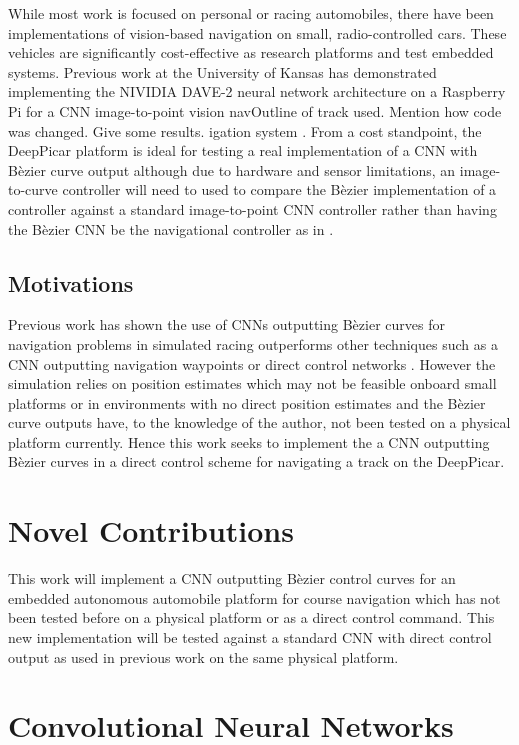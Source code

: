 \documentclass[conference]{IEEEtran}
\begin{document}
While most work is focused on personal or racing automobiles, there have been implementations of vision-based navigation on small, radio-controlled cars. These vehicles are significantly cost-effective as research platforms and test embedded systems. Previous work at the University of Kansas has demonstrated implementing the NIVIDIA DAVE-2 neural network architecture on a Raspberry Pi for a CNN image-to-point vision navOutline of track used.
Mention how code was changed.
Give some results. igation system \cite{bechtel2018}. From a cost standpoint, the DeepPicar platform is ideal for testing a real implementation of a CNN with B\`ezier curve output although due to hardware and sensor limitations, an image-to-curve controller will need to used to compare the B\`ezier implementation of a controller against a standard image-to-point CNN controller rather than having the B\`ezier CNN be the navigational controller as in \cite{trent2020iros}.

\subsection{Motivations}

Previous work has shown the use of CNNs outputting B\`ezier curves for navigation problems in simulated racing outperforms other techniques such as a CNN outputting navigation waypoints or direct control networks \cite{trent2020iros}. However the simulation relies on position estimates which may not be feasible onboard small platforms or in environments with no direct position estimates and the B\`ezier curve outputs have, to the knowledge of the author, not been tested on a physical platform currently. Hence this work seeks to implement the a CNN outputting B\`ezier curves in a direct control scheme for navigating a track on the DeepPicar.

\section{Novel Contributions}

This work will implement a CNN outputting B\`ezier control curves for an embedded autonomous automobile platform for course navigation which has not been tested before on a physical platform or as a direct control command. This new implementation will be tested against a standard CNN with direct control output as used in previous work \cite{bechtel2018} on the same physical platform.

\section{Convolutional Neural Networks}
\end{document}
